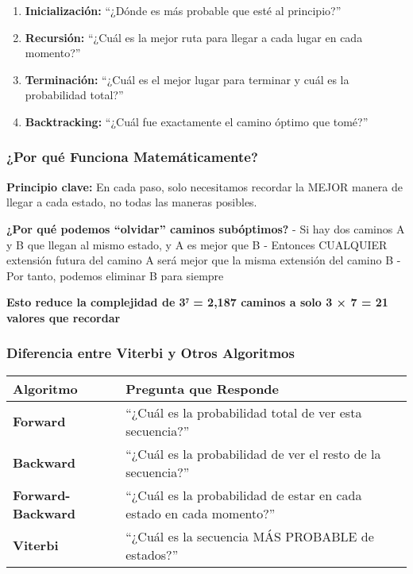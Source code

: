 \documentclass[
]{article}
\providecommand{\tightlist}{%
  \setlength{\itemsep}{0pt}\setlength{\parskip}{0pt}}
\begin{document}
\begin{enumerate}
\def\labelenumi{\arabic{enumi}.}
\tightlist
\item
  \textbf{Inicialización:} ``¿Dónde es más probable que esté al
  principio?''
\item
  \textbf{Recursión:} ``¿Cuál es la mejor ruta para llegar a cada lugar
  en cada momento?''
\item
  \textbf{Terminación:} ``¿Cuál es el mejor lugar para terminar y cuál
  es la probabilidad total?''
\item
  \textbf{Backtracking:} ``¿Cuál fue exactamente el camino óptimo que
  tomé?''
\end{enumerate}

\subsubsection{¿Por qué Funciona
Matemáticamente?}\label{por-quuxe9-funciona-matemuxe1ticamente}

\textbf{Principio clave:} En cada paso, solo necesitamos recordar la
MEJOR manera de llegar a cada estado, no todas las maneras posibles.

\textbf{¿Por qué podemos ``olvidar'' caminos subóptimos?} - Si hay dos
caminos A y B que llegan al mismo estado, y A es mejor que B - Entonces
CUALQUIER extensión futura del camino A será mejor que la misma
extensión del camino B - Por tanto, podemos eliminar B para siempre

\textbf{Esto reduce la complejidad de 3⁷ = 2,187 caminos a solo 3 × 7 =
21 valores que recordar}

\subsubsection{Diferencia entre Viterbi y Otros
Algoritmos}\label{diferencia-entre-viterbi-y-otros-algoritmos}

\begin{longtable}[]{@{}
  >{\raggedright\arraybackslash}p{}
  >{\raggedright\arraybackslash}p{}@{}}
\toprule\noalign{}
\begin{minipage}[b]{\linewidth}\raggedright
Algoritmo
\end{minipage} & \begin{minipage}[b]{\linewidth}\raggedright
Pregunta que Responde
\end{minipage} \\
\midrule\noalign{}
\endhead
\bottomrule\noalign{}
\endlastfoot
\textbf{Forward} & ``¿Cuál es la probabilidad total de ver esta
secuencia?'' \\
\textbf{Backward} & ``¿Cuál es la probabilidad de ver el resto de la
secuencia?'' \\
\textbf{Forward-Backward} & ``¿Cuál es la probabilidad de estar en cada
estado en cada momento?'' \\
\textbf{Viterbi} & ``¿Cuál es la secuencia MÁS PROBABLE de estados?'' \\
\end{longtable}
\end{document}
